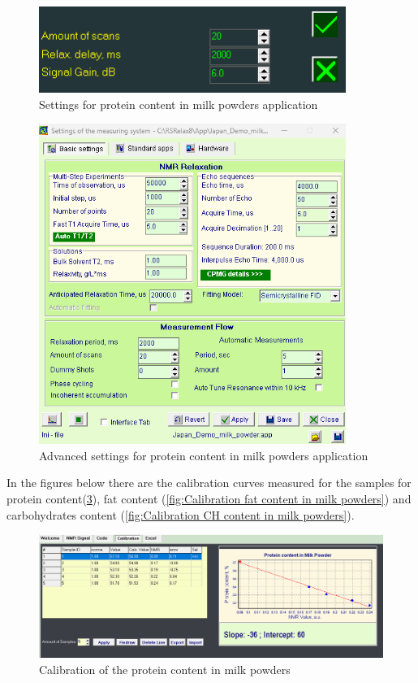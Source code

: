 \documentclass[a4paper,12pt]{article}
\begin{document}
\begin{figure}[H]
\centering
\includegraphics[width=10cm]{Gui_Milk_Fat.png}
\caption{Settings for protein content in milk powders application}
\label{fig:Gui Settings for protein content in milk powders application}
\end{figure}

\begin{figure}[H]
\centering
\includegraphics[width=10cm]{Settings_Milk_Fat.png}
\caption{Advanced settings for protein content in milk powders application}
\label{fig:Settings for protein content in milk powders application}
\end{figure}

In the figures below there are the calibration curves measured for the samples for protein content(\cref{fig:Calibration protein content in milk powders}), fat content (\cref{fig:Calibration fat content in milk powders}) and carbohydrates content (\cref{fig:Calibration CH content in milk powders}).

\begin{figure}[H]
\centering
\includegraphics[width=17cm]{Calibration_Milk_Protein.png}
\caption{Calibration of the protein content in milk powders}
\label{fig:Calibration protein content in milk powders}
\end{figure}
\end{document}
